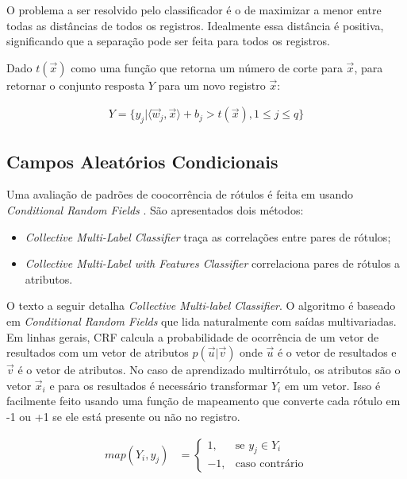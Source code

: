 \documentclass[runningheads,a4paper]{llncs}
\begin{document}
O problema a ser resolvido pelo classificador é o de maximizar a menor entre todas as distâncias de todos os registros. Idealmente essa distância é positiva, significando que a separação pode ser feita para todos os registros.

Dado $t(\vec{x})$ como uma função que retorna um número de corte para $\vec{x}$, para retornar o conjunto resposta $Y$ para um novo registro $\vec{x}$:

\begin{align*}
	Y = \{ y_j | \langle \vec{w}_j,\vec{x} \rangle + b_j > t(\vec{x}), 1 \leq j \leq q \}
\end{align*}


\subsection{Campos Aleatórios Condicionais}
Uma avaliação de padrões de coocorrência de rótulos é feita em \cite{Ghamrawi2005-fw} usando \textit{Conditional Random Fields} \cite{Lafferty2001-ov}. São apresentados dois métodos: 

\begin{itemize}
	\item \textit{Collective Multi-Label Classifier} traça as correlações entre pares de rótulos;
	\item \textit{Collective Multi-Label with Features Classifier} correlaciona pares de rótulos a atributos.	
\end{itemize}

O texto a seguir detalha \textit{Collective Multi-label Classifier}. O algoritmo é baseado em \textit{Conditional Random Fields} que lida naturalmente com saídas multivariadas. Em linhas gerais, CRF calcula a probabilidade de ocorrência de um vetor de resultados com um vetor de atributos $p(\vec{u} | \vec{v})$ onde $\vec{u}$ é o vetor de resultados e $\vec{v}$ é o vetor de atributos. No caso de aprendizado multirrótulo, os atributos são o vetor $\vec{x}_i$ e para os resultados é necessário transformar $Y_i$ em um vetor. Isso é facilmente feito usando uma função de mapeamento que converte cada rótulo em -1 ou +1 se ele está presente ou não no registro.

\begin{align*}
	map(Y_i, y_j) &= \begin{cases}
		1, & \text{se $y_j \in Y_i$} \\
		-1, & \text{caso contrário}
	\end{cases}
\end{align*}
\end{document}

